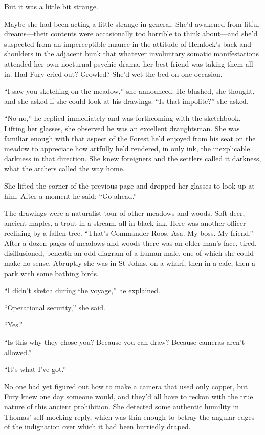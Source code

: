 \documentclass[11pt,a5paper]{article}
\begin{document}
But it was a little bit strange.

Maybe she had been acting a little strange in general. She'd awakened from fitful dreams---their contents were occasionally too horrible to think about---and she'd suspected from an imperceptible nuance in the attitude of Hemlock's back and shoulders in the adjacent bunk that whatever involuntary somatic manifestations attended her own nocturnal psychic drama, her best friend was taking them all in. Had Fury cried out? Growled? She'd wet the bed on one occasion.

``I saw you sketching on the meadow,'' she announced. He blushed, she thought, and she asked if she could look at his drawings. ``Is that impolite?'' she asked.

``No no,'' he replied immediately and was forthcoming with the sketchbook. Lifting her glasses, she observed he was an excellent draughtsman. She was familiar enough with that aspect of the Forest he'd enjoyed from his seat on the meadow to appreciate how artfully he'd rendered, in only ink, the inexplicable darkness in that direction. She knew foreigners and the settlers called it darkness, what the archers called the way home.

She lifted the corner of the previous page and dropped her glasses to look up at him. After a moment he said: ``Go ahead.''

The drawings were a naturalist tour of other meadows and woods. Soft deer, ancient maples, a trout in a stream, all in black ink. Here was another officer reclining by a fallen tree. ``That's Commander Roos. Asa. My boss. My friend.'' After a dozen pages of meadows and woods there was an older man's face, tired, disillusioned, beneath an odd diagram of a human male, one of which she could make no sense. Abruptly she was in St Johns, on a wharf, then in a cafe, then a park with some bathing birds.

``I didn't sketch during the voyage,'' he explained.

``Operational security,'' she said.

``Yes.''

``Is this why they chose you? Because you can draw? Because cameras aren't allowed.''

``It's what I've got.''

No one had yet figured out how to make a camera that used only copper, but Fury knew one day someone would, and they'd all have to reckon with the true nature of this ancient prohibition. She detected some authentic humility in Thomas' self-mocking reply, which was thin enough to betray the angular edges of the indignation over which it had been hurriedly draped.
\end{document}
